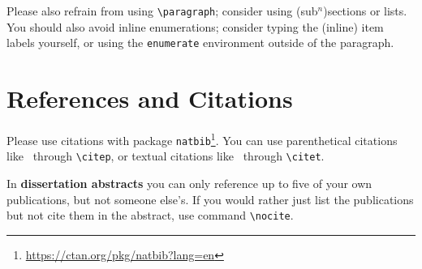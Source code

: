 \documentclass[news]{sigirforum}
\begin{document}
%

Please also refrain from using \texttt{\textbackslash paragraph}; consider using (sub$^n$)sections or lists. You should also avoid inline enumerations; consider typing the (inline) item labels yourself, or using the \texttt{enumerate} environment outside of the paragraph.

\section{References and Citations}

Please use citations with package \texttt{natbib}\footnote{\url{https://ctan.org/pkg/natbib?lang=en}}.
You can use parenthetical citations like~\citep{forum} through \texttt{\textbackslash citep}, or textual citations like~\citet{forum} through \texttt{\textbackslash citet}.

In \textbf{dissertation abstracts} you can only reference up to five of your own publications, but not someone else's. If you would rather just list the publications but not cite them in the abstract, use command \texttt{\textbackslash nocite}.
\end{document}
